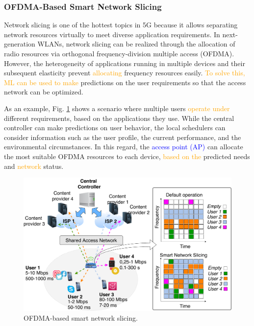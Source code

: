 \documentclass[journal]{IEEEtran}
\begin{document}
\subsubsection{OFDMA-Based Smart Network Slicing} 
Network slicing is one of the hottest topics in 5G because it allows separating network resources virtually to meet diverse application requirements. In next-generation WLANs, network slicing can be realized through the allocation of radio resources via orthogonal frequency-division multiple access (OFDMA). However, the heterogeneity of applications running in multiple devices and their subsequent elasticity prevent \textcolor{orange}{allocating} frequency resources easily. \textcolor{orange}{To solve this, ML can be used to make} predictions on the user requirements so that the access network can be optimized.

As an example, Fig. \ref{fig:use_cases} shows a scenario where multiple users \textcolor{orange}{operate under} different requirements, based on the applications they use. While the central controller can make predictions on user behavior, the local schedulers can consider information such as the user profile, the current performance, and the environmental circumstances. In this regard, the \textcolor{blue}{access point (AP)} can allocate the most suitable OFDMA resources to each device, \textcolor{orange}{based on the} predicted needs and \textcolor{orange}{network} status.

\begin{figure}[ht!]
	\centering
	\includegraphics[width=1\columnwidth]{network_slicing_ofdma}
	\caption{OFDMA-based smart network slicing.}
	\label{fig:use_cases}
\end{figure}
\end{document}
